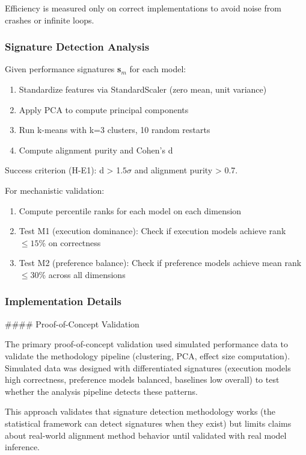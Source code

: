 Efficiency is measured only on correct implementations to avoid noise from crashes or infinite loops.

\subsubsection{Signature Detection Analysis}

Given performance signatures \textbf{s}$_{m}$ for each model:

\begin{enumerate}
\item Standardize features via StandardScaler (zero mean, unit variance)
\item Apply PCA to compute principal components
\item Run k-means with k=3 clusters, 10 random restarts
\item Compute alignment purity and Cohen's d
\end{enumerate}

Success criterion (H-E1): d > 1.$5\sigma$ and alignment purity > 0.7.

For mechanistic validation:

\begin{enumerate}
\item Compute percentile ranks for each model on each dimension
\item Test M1 (execution dominance): Check if execution models achieve rank $\leq 15$\% on correctness
\item Test M2 (preference balance): Check if preference models achieve mean rank $\leq 30$\% across all dimensions
\end{enumerate}

\subsubsection{Implementation Details}

\#\#\#\# Proof-of-Concept Validation

The primary proof-of-concept validation used simulated performance data to validate the methodology pipeline (clustering, PCA, effect size computation). Simulated data was designed with differentiated signatures (execution models high correctness, preference models balanced, baselines low overall) to test whether the analysis pipeline detects these patterns.

This approach validates that signature detection methodology works (the statistical framework can detect signatures when they exist) but limits claims about real-world alignment method behavior until validated with real model inference.

